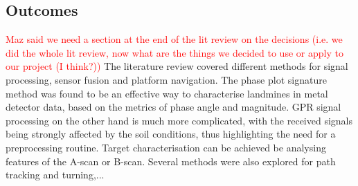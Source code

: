 \documentclass[main.tex]{subfiles}
\begin{document}
\subsection{Outcomes}
\textcolor{red}{Maz said we need a section at the end of the lit review on the decisions (i.e. we did the whole lit review, now what are the things we decided to use or apply to our project (I think?))}
The literature review covered different methods for signal processing, sensor fusion and platform navigation. The phase plot signature method was found to be an effective way to characterise landmines in metal detector data, based on the metrics of phase angle and magnitude. GPR signal processing on the other hand is much more complicated, with the received signals being strongly affected by the soil conditions, thus highlighting the need for a preprocessing routine. Target characterisation can be achieved be analysing features of the A-scan or B-scan. Several methods were also explored for path tracking and turning,... 
\end{document}
